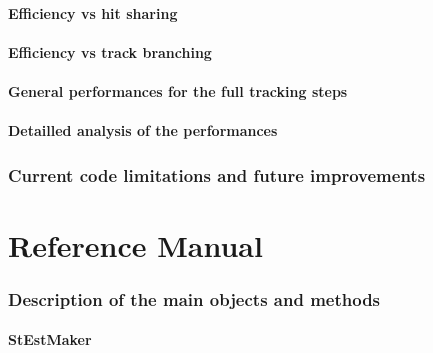 \documentclass[twoside]{article}
\begin{document}
\subsection{Efficiency vs hit sharing}
\subsection{Efficiency vs track branching}
\subsection{General performances for the full tracking steps}
\subsection{Detailled analysis of the performances}



\section{Current code limitations and future improvements}
\label{sec:limitations}

\clearpage

%
%
\part{Reference Manual}

\section{Description of the main objects and methods}
\subsection{StEstMaker}
\label{sec:StEstMakerq}
\end{document}
